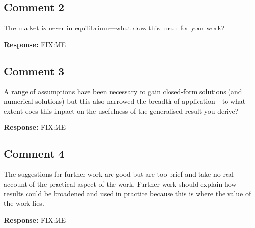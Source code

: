 \documentclass[10pt,a4paper,notitlepage]{article}
\numberwithin{equation}{section}
\begin{document}
\subsection{Comment 2}
The market is never in equilibrium---what does this mean for your work?

\textbf{Response:}
FIX:ME

\subsection{Comment 3}
A range of assumptions have been necessary to gain closed-form solutions (and numerical solutions) but this also narrowed the breadth of application---to what extent does this impact on the usefulness of the generalised result you derive?

\textbf{Response:}
FIX:ME

\subsection{Comment 4}
The suggestions for further work are good but are too brief and take no real account of the practical aspect of the work. Further work should explain how results could be broadened and used in practice because this is where the value of the work lies.

\textbf{Response:}
FIX:ME
\end{document}
